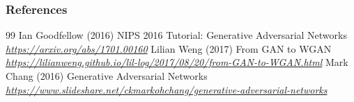 \documentclass[11pt,compress,t,notes=noshow, xcolor=table]{beamer}
\begin{document}
\begin{vbframe}
\frametitle{References}
\footnotesize{
\begin{thebibliography}{99}
 Ian Goodfellow (2016)
\newblock NIPS 2016 Tutorial: Generative Adversarial Networks
\newblock \emph{\url{https://arxiv.org/abs/1701.00160}}
 Lilian Weng (2017)
\newblock From GAN to WGAN
\newblock \emph{\url{https://lilianweng.github.io/lil-log/2017/08/20/from-GAN-to-WGAN.html}}
 Mark Chang (2016)
\newblock Generative Adversarial Networks
\newblock \emph{\url{https://www.slideshare.net/ckmarkohchang/generative-adversarial-networks}}

\end{thebibliography}}
\end{vbframe}
\end{document}
